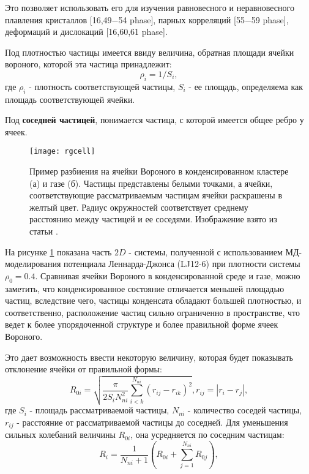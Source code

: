 Это позволяет использовать его для изучения равновесного и неравновесного плавления кристаллов [16,49−54 phase], парных корреляций [55−59 phase], деформаций и дислокаций [16,60,61 phase].

Под плотностью частицы имеется ввиду величина, обратная площади ячейки вороного, которой эта частица принадлежит:
\begin{equation}
\rho_i = 1 / S_i,
\label{eqRho}
\end{equation}
где $\rho_i$ - плотность соответствующей частицы, $S_i$ - ее площадь, определяема как площадь соответствующей ячейки.

Под \textbf{соседней частицей}, понимается частица, с которой имеется общее ребро у ячеек.

\begin{figure}[h]
\begin{center}
\texttt{[image: rgcell]}
\caption{Пример разбиения на ячейки Вороного в конденсированном кластере (а) и газе (б). Частицы представлены белыми точками, а ячейки, соответствующие рассматриваемым частицам ячейки раскрашены в желтый цвет. Радиус окружностей соответствует среднему расстоянию между частицей и ее соседями. Изображение взято из статьи \cite{Ovcharov2017}.}
\label{risFlucMed}
\end{center}
\end{figure}

На рисунке \ref{risFlucMed} показана часть $2D$ - системы, полученной с использованием МД-моделирования потенциала Леннарда-Джонса (LJ12-6) при плотности системы $\rho_0 = 0.4$.
Сравнивая ячейки Вороного в конденсированной среде и газе, можно заметить, что конденсированное состояние отличается меньшей площадью частиц, вследствие чего, частицы конденсата обладают большей плотностью, и соответственно, расположение частиц сильно ограниченно в пространстве, что ведет к более упорядоченной структуре и более правильной форме ячеек Вороного.

Это дает возможность ввести некоторую величину, которая будет показывать отклонение ячейки от правильной формы:
\begin{equation}
	R_{0i} = \sqrt{\frac{\pi}{2 S_i N_{ni}^2} \sum\limits_{i<k}^{N_{ni}} (r_{ij} - r_{ik})^2}, r_{ij} = |r_i - r_j|,
\end{equation}
где $S_i$ - площадь рассматриваемой частицы, $N_{ni}$ - количество соседей частицы, $r_{ij}$ - расстояние от рассматриваемой частицы до соседней.
Для уменьшения сильных колебаний величины $R_{0i}$, она усредняется по соседним частицам:
\begin{equation}\label{eqIrreg}
R_i = \frac{1}{N_{ni} + 1} \left( R_{0i} + \sum\limits_{j=1}^{N_{ni}} R_{0j} \right),
\end{equation}

